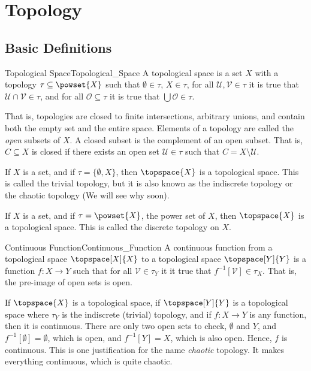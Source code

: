 \section{Topology}
    \subsection{Basic Definitions}
        \begin{fdefinition}{Topological Space}{Topological_Space}
            A topological space is a set $X$ with a topology
            $\tau\subseteq\powset{X}$ such that $\emptyset\in\tau$,
            $X\in\tau$, for all $\mathcal{U},\mathcal{V}\in\tau$ it is true
            that $\mathcal{U}\cap\mathcal{V}\in\tau$, and for all
            $\mathcal{O}\subseteq\tau$ it is true that
            $\bigcup\mathcal{O}\in\tau$.
        \end{fdefinition}
        That is, topologies are closed to finite intersections, arbitrary
        unions, and contain both the empty set and the entire space.
        Elements of a topology are called the \textit{open} subsets of $X$.
        A closed subset is the complement of an open subset. That is,
        $C\subseteq{X}$ is closed if there exists an open set
        $\mathcal{U}\in\tau$ such that $C=X\setminus\mathcal{U}$.
        \begin{example}
            If $X$ is a set, and if $\tau=\{\emptyset,X\}$, then
            $\topspace{X}$ is a topological space. This is called the
            trivial topology, but it is also known as the indiscrete
            topology or the chaotic topology (We will see why soon).
        \end{example}
        \begin{example}
            If $X$ is a set, and if $\tau=\powset{X}$, the power set of $X$,
            then $\topspace{X}$ is a topological space. This is called the
            discrete topology on $X$.
        \end{example}
        \begin{fdefinition}{Continuous Function}{Continuous_Function}
            A continuous function from a topological space $\topspace[X]{X}$
            to a topological space $\topspace[Y]{Y}$ is a function
            $f:X\rightarrow{Y}$ such that for all $\mathcal{V}\in\tau_{Y}$
            it it true that $f^{\minus{1}}[\mathcal{V}]\in\tau_{X}$. That
            is, the pre-image of open sets is open.
        \end{fdefinition}
        \begin{example}
            If $\topspace{X}$ is a topological space, if $\topspace[Y]{Y}$
            is a topological space where $\tau_{Y}$ is the indiscrete
            (trivial) topology, and if $f:X\rightarrow{Y}$ is any function,
            then it is continuous. There are only two open sets to check,
            $\emptyset$ and $Y$, and $f^{\minus{1}}[\emptyset]=\emptyset$,
            which is open, and $f^{\minus{1}}[Y]=X$, which is also open.
            Hence, $f$ is continuous. This is one justification for the name
            \textit{chaotic} topology. It makes everything continuous, which
            is quite chaotic.
        \end{example}
